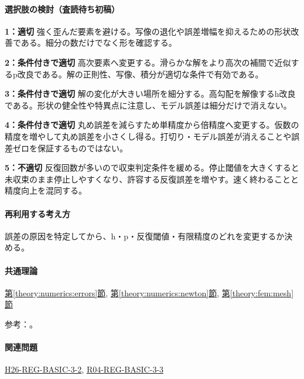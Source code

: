 \paragraph{選択肢の検討（査読待ち初稿）}\mbox{}\par

\noindent\textbf{1：適切} 強く歪んだ要素を避ける。写像の退化や誤差増幅を抑えるための形状改善である。細分の数だけでなく形を確認する。\par

\noindent\textbf{2：条件付きで適切} 高次要素へ変更する。滑らかな解をより高次の補間で近似するp改良である。解の正則性、写像、積分が適切な条件で有効である。\par

\noindent\textbf{3：条件付きで適切} 解の変化が大きい場所を細分する。高勾配を解像するh改良である。形状の健全性や特異点に注意し、モデル誤差は細分だけで消えない。\par

\noindent\textbf{4：条件付きで適切} 丸め誤差を減らすため単精度から倍精度へ変更する。仮数の精度を増やして丸め誤差を小さくし得る。打切り・モデル誤差が消えることや誤差ゼロを保証するものではない。\par

\noindent\textbf{5：不適切} 反復回数が多いので収束判定条件を緩める。停止閾値を大きくすると未収束のまま停止しやすくなり、許容する反復誤差を増やす。速く終わることと精度向上を混同する。\par

\paragraph{再利用する考え方} 誤差の原因を特定してから、h・p・反復閾値・有限精度のどれを変更するか決める。

\paragraph{共通理論} \hyperref[theory:numerics:errors]{第\ref*{theory:numerics:errors}節}, \hyperref[theory:numerics:newton]{第\ref*{theory:numerics:newton}節}, \hyperref[theory:fem:mesh]{第\ref*{theory:fem:mesh}節}

\par 参考：\cite{mit_roy_fea1999,goldberg1991,nist_newton}。

\paragraph{関連問題} \hyperref[q:h26-reg-basic-3-2]{H26-REG-BASIC-3-2}, \hyperref[q:r04-reg-basic-3-3]{R04-REG-BASIC-3-3}

